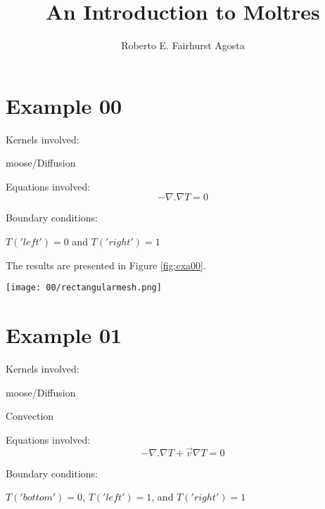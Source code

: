 \documentclass[11pt,letterpaper]{article}
\title{An Introduction to Moltres}
\author{Roberto E. Fairhurst Agosta}
\begin{document}
	\begin{titlepage}
		\maketitle
		\thispagestyle{empty}
	\end{titlepage}
	
\section{Example 00}

Kernels involved:
\begin{description}[font=$\bullet$\scshape\bfseries]
	\item[] moose/Diffusion
\end{description}

Equations involved:
\begin{equation}
-\nabla.\nabla T=0
\end{equation}

Boundary conditions:
\begin{description}[]
	\item[] $T('left')=0$ and $T('right')=1$
\end{description}

The results are presented in Figure \ref{fig:exa00}.
\begin{figure*}[!h]
	\centering
	\texttt{[image: 00/rectangularmesh.png]} 
	\hfill
	\caption{Temperature.}
	\label{fig:exa00}
\end{figure*}

\newpage
\section{Example 01}

Kernels involved:
\begin{description}[font=$\bullet$\scshape\bfseries]
	\item[] moose/Diffusion
	\item[] Convection
\end{description}

Equations involved:
\begin{equation}
-\nabla.\nabla T + \vec{v}\nabla T=0
\end{equation}

Boundary conditions:
\begin{description}[]
	\item[] $T('bottom')=0$, $T('left')=1$, and $T('right')=1$
\end{description}
\end{document}
